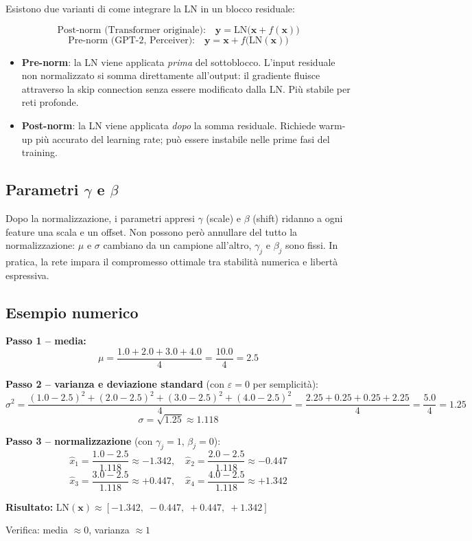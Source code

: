 \documentclass[
  11pt,
]{article}
\begin{document}
Esistono due varianti di come integrare la LN in un blocco residuale:

\begin{formulabox}[title={\textbf{Pre-norm vs Post-norm}}]
\[
\text{Post-norm (Transformer originale):}\quad \mathbf{y} = \text{LN}\bigl(\mathbf{x} + f(\mathbf{x})\bigr)
\]
\[
\text{Pre-norm (GPT-2, Perceiver):}\quad \mathbf{y} = \mathbf{x} + f\bigl(\text{LN}(\mathbf{x})\bigr)
\]
\end{formulabox}

\begin{itemize}
  \item \textbf{Pre-norm}: la LN viene applicata \emph{prima} del sottoblocco. L'input residuale non normalizzato si somma direttamente all'output: il gradiente fluisce attraverso la skip connection senza essere modificato dalla LN. Più stabile per reti profonde.
  \item \textbf{Post-norm}: la LN viene applicata \emph{dopo} la somma residuale. Richiede warm-up più accurato del learning rate; può essere instabile nelle prime fasi del training.
\end{itemize}

\subsection{Parametri $\gamma$ e $\beta$}

Dopo la normalizzazione, i parametri appresi $\gamma$ (scale) e $\beta$ (shift) ridanno a ogni feature una scala e un offset. Non possono però annullare del tutto la normalizzazione: $\mu$ e $\sigma$ cambiano da un campione all'altro, $\gamma_j$ e $\beta_j$ sono fissi. In pratica, la rete impara il compromesso ottimale tra stabilità numerica e libertà espressiva.

\subsection{Esempio numerico}

\begin{notabox}[title={\textbf{Esempio: $\mathbf{x} = [1.0,\;2.0,\;3.0,\;4.0]$, $D=4$}}]
\textbf{Passo 1 -- media:}
\[
\mu = \frac{1.0 + 2.0 + 3.0 + 4.0}{4} = \frac{10.0}{4} = 2.5
\]

\textbf{Passo 2 -- varianza e deviazione standard} (con $\varepsilon = 0$ per semplicità):
\[
\sigma^2 = \frac{(1.0-2.5)^2 + (2.0-2.5)^2 + (3.0-2.5)^2 + (4.0-2.5)^2}{4}
= \frac{2.25 + 0.25 + 0.25 + 2.25}{4} = \frac{5.0}{4} = 1.25
\]
\[
\sigma = \sqrt{1.25} \approx 1.118
\]

\textbf{Passo 3 -- normalizzazione} (con $\gamma_j = 1$, $\beta_j = 0$):
\[
\hat{x}_1 = \frac{1.0 - 2.5}{1.118} \approx -1.342, \quad
\hat{x}_2 = \frac{2.0 - 2.5}{1.118} \approx -0.447
\]
\[
\hat{x}_3 = \frac{3.0 - 2.5}{1.118} \approx +0.447, \quad
\hat{x}_4 = \frac{4.0 - 2.5}{1.118} \approx +1.342
\]

\textbf{Risultato:} $\text{LN}(\mathbf{x}) \approx [-1.342,\;-0.447,\;+0.447,\;+1.342]$

Verifica: media $\approx 0$, varianza $\approx 1$ \checkmark
\end{notabox}
\end{document}
